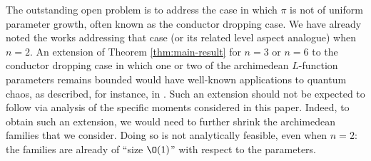 The outstanding open problem is to address the case in which $\pi$ is not of uniform parameter growth, often known as the conductor dropping case.  We have already noted the works \cite{MR1923476, MR2382859, Mi04, michel-2009, MR3912807} addressing that case (or its related level aspect analogue) when $n=2$.  An extension of Theorem \ref{thm:main-result} for $n=3$ or $n=6$ to the conductor dropping case in which one or two of the archimedean $L$-function parameters remains bounded would have well-known applications to quantum chaos, as described, for instance, in \cite{MR1826269, watson-2008, MR2680499, PDN-AP-AS-que, sarnak-progress-que, 2020arXiv200108704N}.  Such an extension should not be expected to follow via analysis of the specific moments considered in this paper.  Indeed, to obtain such an extension, we would need to further shrink the archimedean families that we consider.  Doing so is not analytically feasible, even when $n=2$: the families are already of ``size $\O(1)$'' with respect to the parameters.



